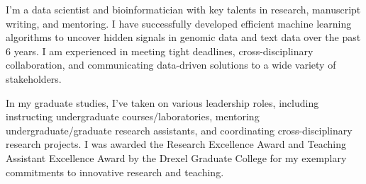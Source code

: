 

\begin{cvparagraph}

I’m a data scientist and bioinformatician with key talents in research, manuscript writing, and mentoring. I have successfully developed efficient machine learning algorithms to uncover hidden signals in genomic data and text data over the past 6 years. I am experienced in meeting tight deadlines, cross-disciplinary collaboration, and communicating data-driven solutions to a wide variety of stakeholders. 

In my graduate studies, I’ve taken on various leadership roles, including instructing undergraduate courses/laboratories, mentoring undergraduate/graduate research assistants, and coordinating cross-disciplinary research projects. I was awarded the Research Excellence Award and Teaching Assistant Excellence Award by the Drexel Graduate College for my exemplary commitments to innovative research and teaching. 
\end{cvparagraph}